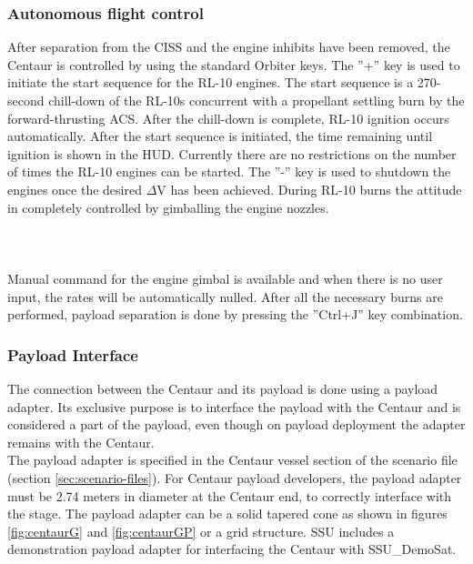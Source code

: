 \documentclass[Space_Shuttle_Ultra_Manual.tex]{subfiles}
\begin{document}
\begin{multicols*}{2}
\subsubsection{Autonomous flight control}
After separation from the CISS and the engine inhibits have been removed, the Centaur is controlled by using the standard Orbiter keys. The ''+'' key is used to initiate the start sequence for the RL-10 engines. The start sequence is a 270-second chill-down of the RL-10s concurrent with a propellant settling burn by the forward-thrusting ACS. After the chill-down is complete, RL-10 ignition occurs automatically. After the start sequence is initiated, the time remaining until ignition is shown in the HUD. Currently there are no restrictions on the number of times the RL-10 engines can be started. The ''-'' key is used to shutdown the engines once the desired $\Delta$V has been achieved. During RL-10 burns the attitude in completely controlled by gimballing the engine nozzles.
\\
\\
\\
\\
Manual command for the engine gimbal is available and when there is no user input, the rates will be automatically nulled. After all the necessary burns are performed, payload separation is done by pressing the ''Ctrl+J'' key combination.

\subsubsection{Payload Interface}
The connection between the Centaur and its payload is done using a payload adapter. Its exclusive purpose is to interface the payload with the Centaur and is considered a part of the payload, even though on payload deployment the adapter remains with the Centaur.\\
The payload adapter is specified in the Centaur vessel section of the scenario file (section \ref{sec:scenario-files}).
For Centaur payload developers, the payload adapter must be 2.74 meters in diameter at the Centaur end, to correctly interface with the stage. The payload adapter can be a solid tapered cone as shown in figures \ref{fig:centaurG} and \ref{fig:centaurGP} or a grid structure. SSU includes a demonstration payload adapter for interfacing the Centaur with SSU\_DemoSat.

\end{multicols*}
\newpage
\end{document}
